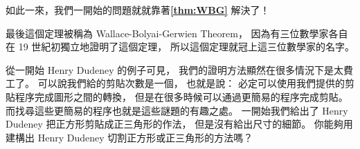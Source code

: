 \documentclass{article}
\begin{document}
\begin{multicols}{2}
\noindent
如此一來，我們一開始的問題就就靠著\textbf{\autoref{thm:WBG}} 解決了！

\dinkus

\noindent
最後這個定理被稱為 Wallace-Bolyai-Gerwien Theorem，
因為有三位數學家各自在 19 世紀初獨立地證明了這個定理，
所以這個定理就冠上這三位數學家的名字。

從一開始 Henry Dudeney 的例子可見，
我們的證明方法顯然在很多情況下是太費工了。
可以說我們給的剪貼次數是一個，
也就是說：
必定可以使用我們提供的剪貼程序完成圖形之間的轉換，
但是在很多時候可以通過更簡易的程序完成剪貼。
而找尋這些更簡易的程序也就是這些謎題的有趣之處。
一開始我們給出了 Henry Dudeney 把正方形剪貼成正三角形的作法，
但是沒有給出尺寸的細節。
你能夠用建構出 Henry Dudeney 切割正方形或正三角形的方法嗎？
\asDemonstrated

\end{multicols}
\end{document}
